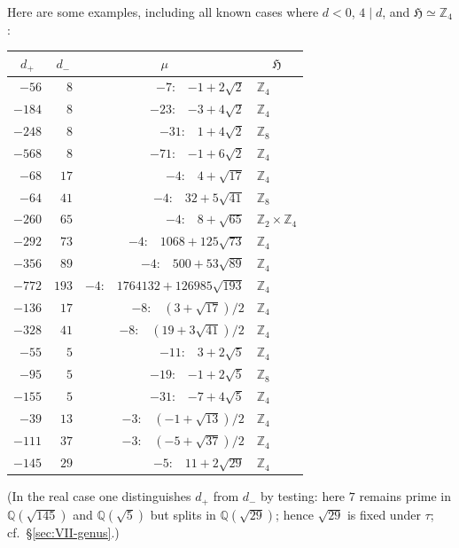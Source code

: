 Here are some examples, including all known cases where $d<0$, $4\mid d$,
and $\mathfrak{H}\simeq\mathbb{Z}_{4}$:

\begin{center}
\begin{tabular}{rrrl}
\multicolumn{1}{c}{$d_{+}$} & \multicolumn{1}{c}{$d_{-}$} & 
\multicolumn{1}{c}{$\mu$} & \multicolumn{1}{c}{$\mathfrak{H}$}\\
\hline
$-56$ & $8$ & $-7$:\ \ $-1+2\sqrt{2}$ & $\mathbb{Z}_{4}$\\
$-184$ & $8$ & $-23$:\ \ $-3+4\sqrt{2}$ & $\mathbb{Z}_{4}$\\
$-248$ & $8$ & $-31$:\ \ $1+4\sqrt{2}$ & $\mathbb{Z}_{8}$\\
$-568$ & $8$ & $-71$:\ \ $-1+6\sqrt{2}$ & $\mathbb{Z}_{4}$\\
$-68$ & $17$ & $-4$:\ \ $4+\sqrt{17}$ & $\mathbb{Z}_{4}$\\
$-64$ & $41$ & $-4$:\ \ $32+5\sqrt{41}$ & $\mathbb{Z}_{8}$\\
$-260$ & $65$ & $-4$:\ \ $8+\sqrt{65}$ & $\mathbb{Z}_{2}\times\mathbb{Z}_{4}$\\
$-292$ & $73$ & $-4$:\ \ $1068+125\sqrt{73}$ & $\mathbb{Z}_{4}$\\
$-356$ & $89$ & $-4$:\ \ $500+53\sqrt{89}$ & $\mathbb{Z}_{4}$\\
$-772$ & $193$ & $-4$:\ \ $1764132+126985\sqrt{193}$ & $\mathbb{Z}_{4}$\\
$-136$ & $17$ & $-8$:\ \ $(3+\sqrt{17})/2$ & $\mathbb{Z}_{4}$\\
$-328$ & $41$ & $-8$:\ \ $(19+3\sqrt{41})/2$ & $\mathbb{Z}_{4}$\\
$-55$ & $5$ & $-11$:\ \ $3+2\sqrt{5}$ & $\mathbb{Z}_{4}$\\
$-95$ & $5$ & $-19$:\ \ $-1+2\sqrt{5}$ & $\mathbb{Z}_{8}$\\
$-155$ & $5$ & $-31$:\ \ $-7+4\sqrt{5}$ & $\mathbb{Z}_{4}$\\
$-39$ & $13$ & $-3$:\ \ $(-1+\sqrt{13})/2$ & $\mathbb{Z}_{4}$\\
$-111$ & $37$ & $-3$:\ \ $(-5+\sqrt{37})/2$ & $\mathbb{Z}_{4}$\\
$-145$ & $29$ & $-5$:\ \ $11+2\sqrt{29}$ & $\mathbb{Z}_{4}$\\
\end{tabular}
\end{center}

(In the real case one distinguishes $d_{+}$ from $d_{-}$ by testing: here
$7$ remains prime in $\mathbb{Q}(\sqrt{145})$ and $\mathbb{Q}(\sqrt{5})$
but splits in $\mathbb{Q}(\sqrt{29})$; hence $\sqrt{29}$ is fixed under
$\tau$; cf.\ §\ref{sec:VII-genus}.)
